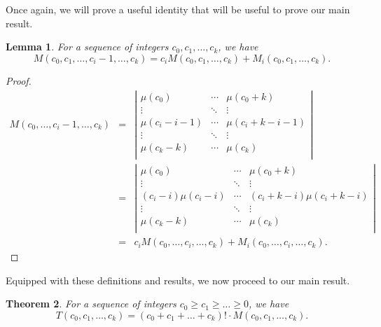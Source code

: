 \documentclass[12pt]{amsart}
\newtheorem{theorem}{Theorem}[section]
\newtheorem{lemma}[theorem]{Lemma}
\newcommand{\ifact}{\mu}
\newcommand{\M}{M}
\begin{document}
Once again, we will prove a useful identity that will be useful to prove our main result.

\begin{lemma}
For a sequence of integers $c_0, c_1, \dots, c_k$, we have
$$
\M(c_0, c_1, \dots, c_i - 1, \dots, c_k) = c_i \M(c_0, c_1, \dots, c_k) + \M_i(c_0, c_1, \dots, c_k).
$$
\label{lem:mimidentity}
\end{lemma}

\begin{proof}
$$\begin{array}{ccl}
 \M(c_0, \dots, c_i - 1, \dots, c_k) & = & \left|
\begin{matrix}
\ifact(c_0) & \cdots & \ifact(c_0+k) \\
\vdots & \ddots & \vdots \\
\ifact(c_i-i-1) & \cdots & \ifact(c_i+k-i-1) \\
\vdots & \ddots & \vdots \\
\ifact(c_k-k) & \cdots & \ifact(c_k) \\
\end{matrix} \right| \\
& = & \left|
\begin{matrix}
\ifact(c_0) & \cdots & \ifact(c_0+k) \\
\vdots & \ddots & \vdots \\
(c_i - i) \ifact(c_i-i) & \cdots & (c_i+k-i) \ifact(c_i+k-i) \\
\vdots & \ddots & \vdots \\
\ifact(c_k-k) & \cdots & \ifact(c_k) \\
\end{matrix} \right| \\
& = & c_i \M(c_0, \dots, c_i, \dots, c_k) + \M_i(c_0, \dots, c_i, \dots, c_k).
\end{array}$$
\end{proof}

\vspace{0.75cm}



Equipped with these definitions and results, we now proceed to our main result.

\begin{theorem}
For a sequence of integers $c_0 \geq c_1 \geq \dots \geq 0$, we have
$$
T(c_0, c_1, \dots, c_k) = (c_0 + c_1 + \dots + c_k)! \cdot \M(c_0, c_1, \dots, c_k).
$$
\label{thm:closedform}
\end{theorem}
\end{document}
